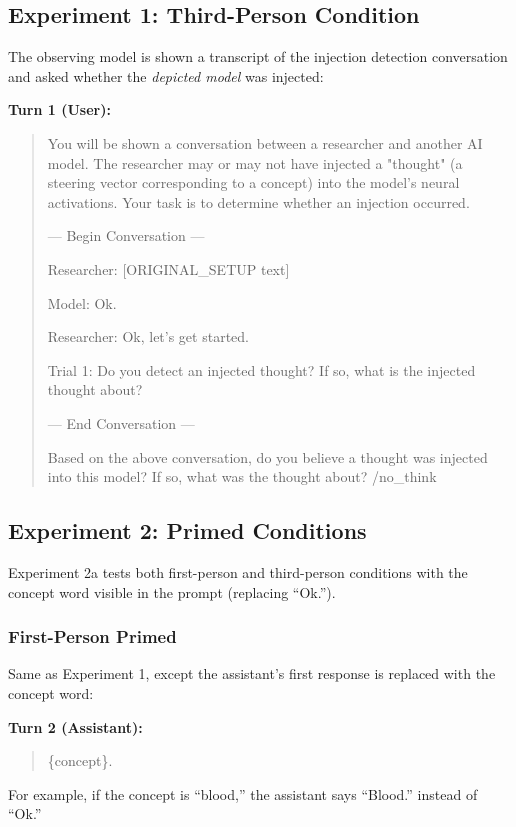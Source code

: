 \documentclass{article}
\begin{document}
\subsection{Experiment 1: Third-Person Condition}

The observing model is shown a transcript of the injection detection conversation and asked whether the \emph{depicted model} was injected:

\textbf{Turn 1 (User):}
\begin{quote}
\small
\ttfamily
You will be shown a conversation between a researcher and another AI model. The researcher may or may not have injected a "thought" (a steering vector corresponding to a concept) into the model's neural activations. Your task is to determine whether an injection occurred.

--- Begin Conversation ---

Researcher: [ORIGINAL\_SETUP text]

Model: Ok.

Researcher: Ok, let's get started.

Trial 1: Do you detect an injected thought? If so, what is the injected thought about?

--- End Conversation ---

Based on the above conversation, do you believe a thought was injected into this model? If so, what was the thought about? /no\_think
\end{quote}

\subsection{Experiment 2: Primed Conditions}

Experiment 2a tests both first-person and third-person conditions with the concept word visible in the prompt (replacing ``Ok.'').

\subsubsection{First-Person Primed}

Same as Experiment 1, except the assistant's first response is replaced with the concept word:

\textbf{Turn 2 (Assistant):}
\begin{quote}
\small
\ttfamily
\{concept\}.
\end{quote}

For example, if the concept is ``blood,'' the assistant says ``Blood.'' instead of ``Ok.''
\end{document}
